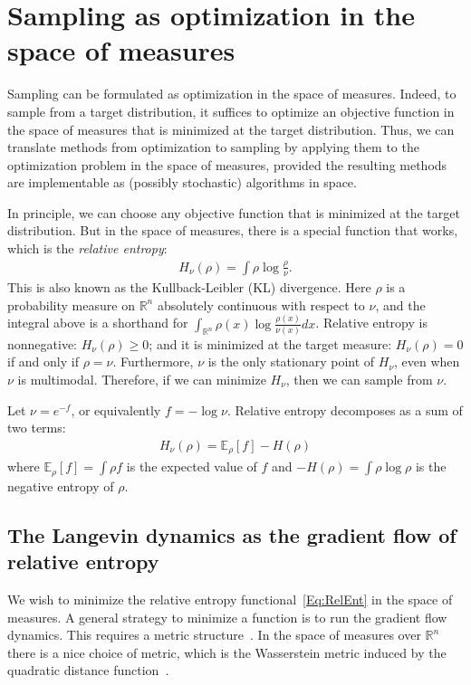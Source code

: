 \documentclass[final,12pt]{colt2018}
\newcommand{\R}{\mathbb{R}}
\newcommand{\E}{\mathbb{E}}
\begin{document}
\section{Sampling as optimization in the space of measures}
\label{Sec:Samp}

Sampling can be formulated as optimization in the space of measures.
Indeed, to sample from a target distribution, it suffices to optimize an objective function in the space of measures that is minimized at the target distribution.
Thus, we can translate methods from optimization to sampling by applying them to the optimization problem in the space of measures, provided the resulting methods are implementable as (possibly stochastic) algorithms in space.

In principle, we can choose any objective function that is minimized at the target distribution.
But in the space of measures, there is a special function that works, which is the {\em relative entropy}:
\begin{align}\label{Eq:RelEnt}
H_\nu(\rho) = \int \rho \log \frac{\rho}{\nu}.
\end{align}
This is also known as the Kullback-Leibler (KL) divergence.
Here $\rho$ is a probability measure on $\R^n$ absolutely continuous with respect to $\nu$, and the integral above is a shorthand for $\int_{\R^n} \rho(x) \log \frac{\rho(x)}{\nu(x)} dx$.
Relative entropy is nonnegative: $H_\nu(\rho) \ge 0$; and it is minimized at the target measure: $H_\nu(\rho) = 0$ if and only if $\rho = \nu$.
Furthermore, $\nu$ is the only stationary point of $H_\nu$, even when $\nu$ is multimodal.
Therefore, if we can minimize $H_\nu$, then we can sample from $\nu$.

 
Let $\nu = e^{-f}$, or equivalently $f = -\log \nu$.
Relative entropy decomposes as
 a sum of two terms:
\begin{align}\label{Eq:RelEnt2}
H_\nu(\rho) = \E_\rho[f] -H(\rho)
\end{align}
where $\E_\rho[f] = \int \rho f$ is the expected value of $f$
and $-H(\rho) = \int \rho \log \rho$ is the negative entropy of $\rho$.


\subsection{The Langevin dynamics as the gradient flow of relative entropy}

We wish to minimize the relative entropy functional~\eqref{Eq:RelEnt} in the space of measures.
A general strategy to minimize a function is to run the gradient flow dynamics. 
This requires a metric structure~\citep{AGS08}.
In the space of measures over $\R^n$ there is a nice choice of metric, which is the Wasserstein metric induced by the quadratic distance function~\citep{Vil03,Vil08}.
\end{document}
